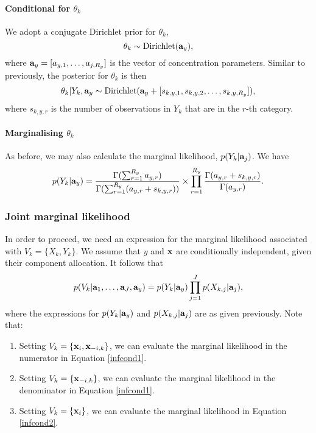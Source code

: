 \documentclass[12pt]{article}
\begin{document}
\paragraph{Conditional for $\theta_{k}$}
We adopt a conjugate Dirichlet prior for $\theta_k$, 
$$\theta_{k} \sim \mbox{Dirichlet}({\bf a}_y),$$ where ${\bf a}_y = [a_{y,1}, \ldots, a_{j,R_y}]$ is the vector of concentration parameters.  Similar to previously, the posterior for $\theta_{k}$ is then
\begin{align}
\theta_{k}|Y_k, {\bf a}_y \sim \mbox{Dirichlet}({\bf a}_y + [s_{k,y,1}, s_{k,y,2}, \ldots, s_{k,y,R_y}]),
\end{align}       
where $s_{k,y,r}$ is the number of observations in $Y_k$ that are in the $r$-th category.  

\paragraph{Marginalising $\theta_{k}$}\label{margintheta}
As before, we may also calculate the marginal likelihood, $p(Y_k| {\bf a}_j)$.  We have       
\begin{equation}
p(Y_k| {\bf a}_y) = \frac{\Gamma(\sum_{r=1}^{R_y}a_{y,r} )}{\Gamma(\sum_{r=1}^{R_y}(a_{y,r}+ s_{k,y,r}) )}\times \prod_{r = 1}^{R_y} \frac{\Gamma(a_{y,r} + s_{k,y,r})}{\Gamma(a_{y,r})}.\label{catrespmarg}
\end{equation}
\subsubsection{Joint marginal likelihood}
In order to proceed, we need an expression for the marginal likelihood associated with $V_k = \{X_k, Y_k\}$.  We assume that $y$ and ${\bf x}$ are conditionally independent, given their component allocation.  It follows that
\begin{equation}
p(V_{k}| {\bf a}_1, \ldots, {\bf a}_J, {\bf a}_y) = p(Y_k|{\bf a}_y)\prod_{j = 1}^J p(X_{k,j}|{\bf a}_j),
\end{equation}
where the expressions for $p(Y_k|{\bf a}_y)$ and $p(X_{k,j}|{\bf a}_j)$ are as given previously.  Note that:
\begin{enumerate}
  \item Setting $V_k = \{{\bf x}_i, {\bf x}_{-i,k}\}$, we can evaluate the marginal likelihood in the numerator in Equation \eqref{infcond1}.
  \item Setting $V_k = \{{\bf x}_{-i,k}\}$, we can evaluate the marginal likelihood in the denominator in Equation \eqref{infcond1}.
  \item Setting $V_k = \{{\bf x}_i\}$, we can evaluate the marginal likelihood in Equation \eqref{infcond2}.  
  \end{enumerate}
\end{document}
